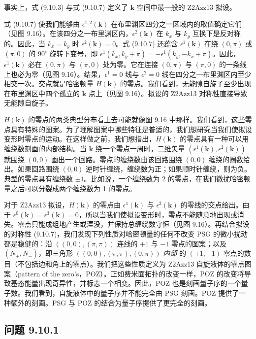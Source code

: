 事实上，式 (9.10.3) 与式 (9.10.7) 定义了 $\pmb{k}$ 空间中最一般的 Z2Azz13 拟设。

式 (9.10.7) 使我们能够由 $\epsilon^{1,2}(\pmb{k})$ 在布里渊区四分之一区域内的取值确定它们（见图 9.16）。在该四分之一布里渊区内，$\epsilon^{2}(\pmb{k})$ 在 $k_{x}$ 与 $k_{y}$ 互换下是反对称的。因此，当 $k_{x}=k_{y}$ 时 $\epsilon^{2}(\pmb{k})=0$。式 (9.10.7) 还蕴含 $\epsilon^{1}(\pmb{k})$ 在绕 $(0,\pi)$ 或 $(\pi,0)$ 的 $90^{\circ}$ 旋转下变号，即 $\epsilon^{1}(k_{x},k_{y}+\pi)=-\epsilon^{1}(k_{y},-k_{x}+\pi)$。因此，$\epsilon^{1}(\pmb{k})$ 必在 $(0,\pi)$ 与 $(\pi,0)$ 处为零。它在连接 $(0,\pi)$ 与 $(\pi,0)$ 的一条线上也必为零（见图 9.16）。结果，$\epsilon^{1}=0$ 线与 $\epsilon^{2}=0$ 线在四分之一布里渊区内至少相交一次。交点就是哈密顿量 $H(\pmb{k})$ 的零点。我们看到，无能隙自旋子至少出现在布里渊区中四个孤立的 $\pmb{k}$ 点上（见图 9.16）。拟设的 Z2Azz13 对称性直接导致无能隙自旋子。

$H(\pmb{k})$ 的零点的两类典型分布看上去可能就像图 9.16 中那样。我们看到，这些零点具有特殊的图案。为了理解图案中哪些特征是普适的，我们想研究当我们使拟设变形时零点的运动。在这样做之前，我们想指出，$H(\pmb{k})$ 的零点具有一种可以用缠绕数刻画的内部结构。当 $\pmb{k}$ 绕一个零点一周时，二维矢量 $(\epsilon^{1}(\pmb{k}),\epsilon^{2}(\pmb{k}))$ 就围绕 $(0,0)$ 画出一个回路。零点的缠绕数由该回路围绕 $(0,0)$ 缠绕的圈数给出。如果回路围绕 $(0,0)$ 逆时针缠绕，缠绕数为正；如果顺时针缠绕，则为负。典型的零点具有缠绕数 $\pm1$。比如说，一个缠绕数为 2 的零点，在我们微扰哈密顿量之后可以分裂成两个缠绕数为 1 的零点。

对于 Z2Azz13 拟设，$H(\pmb{k})$ 的零点由 $\epsilon^{1}(\pmb{k})$ 与 $\epsilon^{2}(\pmb{k})$ 的零线的交点给出。由于 $\epsilon^{0}(\pmb{k})=\epsilon^{3}(\pmb{k})=0$，所以当我们使拟设变形时，零点不能随意地出现或消失。零点只能成组地产生或湮没，并保持总缠绕数守恒（见图 9.16）。再结合拟设的对称性 (9.10.7)，我们发现下列性质对哈密顿量的任何不改变 PSG 的微小扰动都是稳健的：沿 $((0,0),(\pi,\pi))$ 连线的 $+1$ 与 $-1$ 零点的图案；以及 $(N_{+},N_{-})$，即三角形 $((0,0),(\pi,\pi),(0,\pi))$ \emph{内部} 的 $(+1,-1)$ 零点的数目（不包括边和角上的零点）。我们把这些性质定义为 Z2Azz13 自旋液体的零点图案（pattern of the zero's，POZ）。正如费米面拓扑的改变一样，POZ 的改变将导致基态能量出现奇异性，并标志一个相变。因此，POZ 也是刻画量子序的一个量子数。我们看到，自旋液体中的量子序并不能完全由 PSG 刻画。POZ 提供了一种额外的刻画。PSG 与 POZ 的结合为量子序提供了更完全的刻画。

\subsection*{问题 9.10.1}

